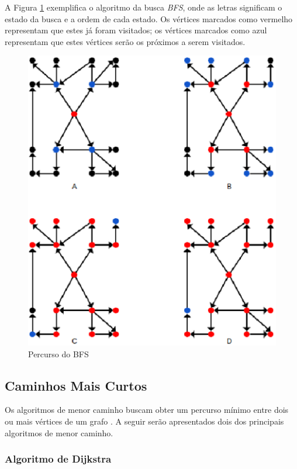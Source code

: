 A Figura \ref{bfs} exemplifica o algoritmo da busca \textit{BFS}, onde as letras significam o estado da busca e a ordem de cada estado. Os vértices marcados como vermelho representam que estes já foram visitados; os vértices marcados como azul representam que estes vértices serão os próximos a serem visitados.

\begin{figure}[!h]
	\centering
	\includegraphics[scale=0.55]{figuras/capitulo2/bfs.eps}
	\caption[Percurso do BFS]{Percurso do BFS \cite{Brassard:1988}}
	\label{bfs}
\end{figure}

\subsection{Caminhos Mais Curtos}

Os algoritmos de menor caminho buscam obter um percurso mínimo entre dois ou mais vértices de um grafo \cite{Cormen:2001}. A seguir serão apresentados dois dos principais algoritmos de menor caminho.

\subsubsection{Algoritmo de Dijkstra}

